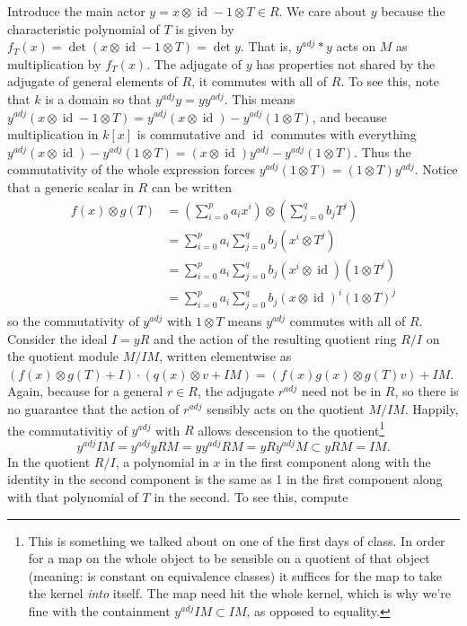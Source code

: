 \documentclass[18pt]{amsart}
\newcommand{\id}{\operatorname{id}}
\begin{document}
	Introduce the main actor $y=x\otimes \id - 1\otimes T\in R$. We care about $y$ because the characteristic polynomial of $T$ is given by $f_T(x)=\det(x\otimes \id - 1\otimes T)=\det y$. That is, $y^{adj}*y$ acts on $M$ as multiplication by $f_T(x)$.
	The adjugate of $y$ has properties not shared by the adjugate of general elements of $R$, it commutes with all of $R$. To see this, note that $k$ is a domain so that $y^{adj}y=yy^{adj}$. This means $y^{adj}(x\otimes \id - 1\otimes T)=y^{adj}(x\otimes \id) -y^{adj}(1\otimes T)$, and because multiplication in $k[x]$ is commutative and $\id$ commutes with everything $y^{adj}(x\otimes \id) -y^{adj}(1\otimes T)=(x\otimes \id)y^{adj} -y^{adj}(1\otimes T)$. Thus the commutativity of the whole expression forces $y^{adj}(1\otimes T)=(1\otimes T)y^{adj}$. Notice that a generic scalar in $R$ can be written
	\begin{align*}
		f(x)\otimes g(T)  & =(\sum_{i=0}^{p} a_i x^i)\otimes (\sum_{j=0}^{q} b_j T^j)\\
				  & =\sum_{i=0}^{p}a_i\sum_{j=0}^{q} b_j (x^i\otimes T^j) \\
				  & =\sum_{i=0}^{p}a_i \sum_{j=0}^{q} b_j (x^i \otimes \id)(1 \otimes T^j)\\
				  & =\sum_{i=0}^{p}a_i \sum_{j=0}^{q} b_j (x \otimes \id)^i(1 \otimes T)^j
	\end{align*}
so the commutativity of $y^{adj}$ with $1 \otimes T$ means $y^{adj}$ commutes with all of $R$. 
	Consider the ideal $I=yR$ and the action of the resulting quotient ring $R/I$  on the quotient module $M/IM$, written elementwise as $(f(x)\otimes g(T)+I)\cdot (q(x)\otimes v +IM)=(f(x)g(x)\otimes g(T)v)+IM$. Again, because for a general $r\in R$, the adjugate $r^{adj}$ need not be in $R$, so there is no guarantee that the action of $r^{adj}$ sensibly acts on the quotient $M/IM$. Happily, the commutativitiy of $y^{adj}$ with $R$ allows descension to the quotient\footnote{This is something we talked about on one of the first days of class. In order for a map on the whole object to be sensible on a quotient of that object (meaning: is constant on equivalence classes) it suffices for the map to take the kernel \emph{into} itself. The map need hit the whole kernel, which is why we're fine with the containment $y^{adj}IM \subset IM$, as opposed to equality.}
	\begin{equation*}
		y^{adj}IM=y^{adj}yRM=yy^{adj}RM=yRy^{adj}M\subset yRM =IM.
	\end{equation*}
In the quotient $R/I$, a polynomial in $x$ in the first component along with the identity in the second component is the same as 1 in the first component along with that polynomial of $T$ in the second. To see this, compute
\end{document}

